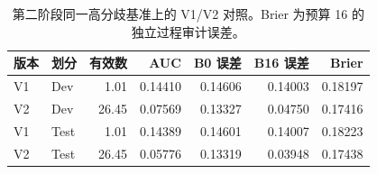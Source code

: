 \begin{table}[tbp]
\centering\small
\setlength{\tabcolsep}{4pt}
\caption{第二阶段同一高分歧基准上的 V1/V2 对照。Brier 为预算 16 的独立过程审计误差。}\label{tab:v2-overview}
\begin{tabular}{llrrrrr}
\toprule
版本 & 划分 & 有效数 & AUC & B0 误差 & B16 误差 & Brier \\
\midrule
V1 & Dev & 1.01 & 0.14410 & 0.14606 & 0.14003 & 0.18197 \\
V2 & Dev & 26.45 & 0.07569 & 0.13327 & 0.04750 & 0.17416 \\
V1 & Test & 1.01 & 0.14389 & 0.14601 & 0.14007 & 0.18223 \\
V2 & Test & 26.45 & 0.05776 & 0.13319 & 0.03948 & 0.17438 \\
\bottomrule
\end{tabular}
\end{table}
